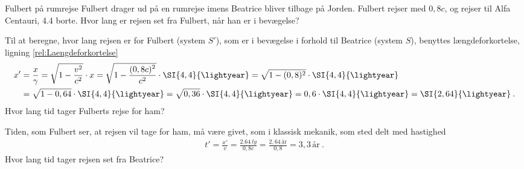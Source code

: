 \begin{opgave}{Fulbert på rumrejse} \label{opg:FulbertPaaRumrejse}
    Fulbert drager ud på en rumrejse imens Beatrice bliver tilbage på Jorden.
    Fulbert rejser med $0,8 c$, og rejser til Alfa Centauri, \SI{4,4}{\lightyear} borte.
    \opg Hvor lang er rejsen set fra Fulbert, når han er i bevægelse? 
    
    Til at beregne, hvor lang rejsen er for Fulbert (system $S'$), som er i bevægelse i forhold til Beatrice (system $S$), benyttes længdeforkortelse, ligning \ref{rel:Laengdeforkortelse}
    \begin{align}
        x' &= \frac{x}{\gamma}
            = \sqrt{1 - \frac{v^2}{c^2}} \cdot x
            = \sqrt{1 - \dfrac{(0,8c)^2}{c^2}} \cdot \SI{4,4}{\lightyear}
            = \sqrt{1 - (0,8)^2} \cdot \SI{4,4}{\lightyear} \nonumber\\
            &= \sqrt{1 - 0,64} \cdot \SI{4,4}{\lightyear}
            = \sqrt{0,36} \cdot \SI{4,4}{\lightyear}
            = 0,6 \cdot \SI{4,4}{\lightyear}
            = \SI{2,64}{\lightyear} \: .
    \end{align}
    \opg Hvor lang tid tager Fulberts rejse for ham?
    
    Tiden, som Fulbert ser, at rejsen vil tage for ham, må være givet, som i klassisk mekanik, som sted delt med hastighed
    \begin{align}
        t'= \frac{x'}{v} = \frac{\SI{2,64}{ly}}{0,8c} = \frac{2,64 \, \text{år}}{0,8} = 3,3 \, \text{år} \: .
    \end{align}
    \opg Hvor lang tid tager rejsen set fra Beatrice?
    

\end{opgave}
